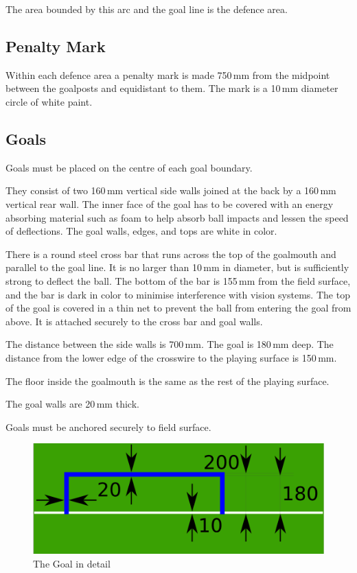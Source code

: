 The area bounded by this arc and the goal line is the defence area.

\subsection{Penalty Mark}
Within each defence area a penalty mark is made 750\,mm from the midpoint between the goalposts and equidistant to them.
The mark is a 10\,mm diameter circle of white paint.

\subsection{Goals}
Goals must be placed on the centre of each goal boundary.

They consist of two 160\,mm vertical side walls joined at the back by a 160\,mm vertical rear wall.
The inner face of the goal has to be covered with an energy absorbing material such as foam to help absorb ball impacts and lessen the speed of deflections.
The goal walls, edges, and tops are white in color.

There is a round steel cross bar that runs across the top of the goalmouth and parallel to the goal line.
It is no larger than 10\,mm in diameter, but is sufficiently strong to deflect the ball.
The bottom of the bar is 155\,mm from the field surface, and the bar is dark in color to minimise interference with vision systems.
The top of the goal is covered in a thin net to prevent the ball from entering the goal from above.
It is attached securely to the cross bar and goal walls.

The distance between the side walls is 700\,mm.
The goal is 180\,mm deep.
The distance from the lower edge of the crosswire to the playing surface is 150\,mm.

The floor inside the goalmouth is the same as the rest of the playing surface.

The goal walls are 20\,mm thick.

Goals must be anchored securely to field surface.

\begin{figure}[ht] %
	\centering
	\includegraphics[width=0.5\columnwidth]{img/goal_detail.png}
	\caption{The Goal in detail}
	\label{fig:sslgoal}
\end{figure}

